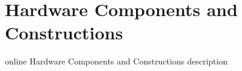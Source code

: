 \section{Hardware Components and Constructions}

online Hardware Components and Constructions description

